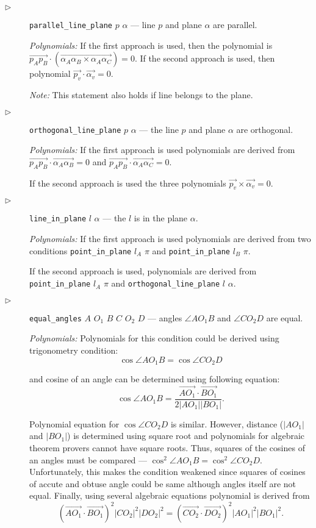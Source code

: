 \documentclass[final,1p,times,authoryear]{elsarticle}
\begin{document}
\begin{description}
\item[$\triangleright$] {\tt parallel\_line\_plane} $p$ $\alpha$ ---
  line $p$ and plane $\alpha$ are parallel.

{\em Polynomials:} 
If the first approach is used, then the polynomial is
$\overrightarrow{p_Ap_B} \cdot (\overrightarrow{\alpha_A\alpha_B \times \alpha_A\alpha_C}) = 0$.
If the second approach is used, then polynomial
$\overrightarrow{p_v} \cdot \overrightarrow{\alpha_v} = 0$.

{\em Note:} This statement also holds if line belongs to the plane.

\item[$\triangleright$] {\tt orthogonal\_line\_plane} $p$ $\alpha$ ---
  the line $p$ and plane $\alpha$ are orthogonal.

{\em Polynomials:} If the first approach is used polynomials are
derived from $\overrightarrow{p_Ap_B} \cdot
\overrightarrow{\alpha_A\alpha_B} = 0$ and $\overrightarrow{p_Ap_B}
\cdot \overrightarrow{\alpha_A\alpha_C} = 0$.

If the second approach is used the three polynomials
$\overrightarrow{p_v} \times \overrightarrow{\alpha_v} = 0$.

\item[$\triangleright$] {\tt line\_in\_plane} $l$ $\alpha$ --- the $l$
  is in the plane $\alpha$.


{\em Polynomials:} If the first approach is used polynomials are
derived from two conditions {\tt point\_in\_plane} $l_A$ $\pi$ and
{\tt point\_in\_plane} $l_B$ $\pi$.

If the second approach is used, polynomials are derived from {\tt
  point\_in\_plane} $l_A$ $\pi$ and {\tt orthogonal\_line\_plane} $l$
$\alpha$.

\item[$\triangleright$] {\tt equal\_angles} $A$ $O_1$ $B$ $C$ $O_2$ $D$ --- angles $\angle AO_1B$ and $\angle
CO_2D$ are equal.

{\em Polynomials:} Polynomials for this condition could be derived
using trigonometry condition:
$$\cos{\angle AO_1B} = \cos{\angle CO_2D}$$

and cosine of an angle can be determined using following equation:
$$\cos{\angle AO_1B} = \frac{\overrightarrow{AO_1}\cdot
  \overrightarrow{BO_1}}{2|AO_1||BO_1|}.$$

Polynomial equation for $\cos{\angle CO_2D}$ is similar. However,
distance ($|AO_1|$ and $|BO_1|$) is determined using square root and
polynomials for algebraic theorem provers cannot have square
roots. Thus, squares of the cosines of an angles must be compared ---
$\cos^2{\angle AO_1B} = \cos^2{\angle CO_2D}$. Unfortunately, this
makes the condition weakened since squares of cosines of accute and
obtuse angle could be same although angles itself are not
equal. Finally, using several algebraic equations polynomial is
derived from
$$(\overrightarrow{AO_1}\cdot  \overrightarrow{BO_1})^2|CO_2|^2|DO_2|^2 = (\overrightarrow{CO_2}\cdot  \overrightarrow{DO_2})^2|AO_1|^2|BO_1|^2.$$


\end{description}
\end{document}
